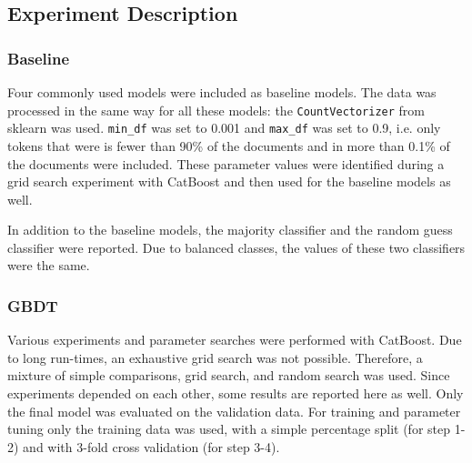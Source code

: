 \documentclass{article}
\begin{document}
	\subsection{Experiment Description}
	
	\subsubsection{Baseline}
	
	Four commonly used models were included as baseline models. The data was processed in the same way for all these models: the \lstinline{CountVectorizer} from sklearn was used. \lstinline{min_df} was set to 0.001 and \lstinline{max_df} was set to 0.9, i.e. only tokens that were is fewer than 90\% of the documents and in more than 0.1\% of the documents were included. These parameter values were identified during a grid search experiment with CatBoost and then used for the baseline models as well.
	
	In addition to the baseline models, the majority classifier and the random guess classifier were reported. Due to balanced classes, the values of these two classifiers were the same.
	
	\subsubsection{GBDT}
	
	Various experiments and parameter searches were performed with CatBoost. Due to long run-times, an exhaustive grid search was not possible. Therefore, a mixture of simple comparisons, grid search, and random search was used. Since experiments depended on each other, some results are reported here as well. Only the final model was evaluated on the validation data. For training and parameter tuning only the training data was used, with a simple percentage split (for step 1-2) and with 3-fold cross validation (for step 3-4).
	
\end{document}
